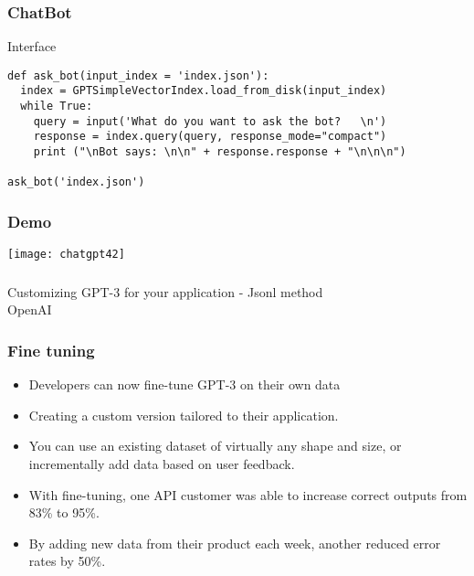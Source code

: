 \begin{frame}[fragile]\frametitle{ChatBot}

Interface

\begin{lstlisting}
def ask_bot(input_index = 'index.json'):
  index = GPTSimpleVectorIndex.load_from_disk(input_index)
  while True:
    query = input('What do you want to ask the bot?   \n')
    response = index.query(query, response_mode="compact")
    print ("\nBot says: \n\n" + response.response + "\n\n\n")
		
ask_bot('index.json')
\end{lstlisting}

\end{frame}

\begin{frame}[fragile]\frametitle{Demo}

\begin{center}
\texttt{[image: chatgpt42]}
\end{center}		


\end{frame}



\begin{frame}[fragile]\frametitle{}
\begin{center}
{\Large Customizing GPT-3 for your application - Jsonl method\\ OpenAI}
\end{center}
\end{frame}

\begin{frame}[fragile]\frametitle{Fine tuning}

\begin{itemize}
\item Developers can now fine-tune GPT-3 on their own data
\item Creating a custom version tailored to their application.
\item You can use an existing dataset of virtually any shape and size, or incrementally add data based on user feedback. 
\item With fine-tuning, one API customer was able to increase correct outputs from 83\% to 95\%. 
\item By adding new data from their product each week, another reduced error rates by 50\%.
\end{itemize}	 

\end{frame}

